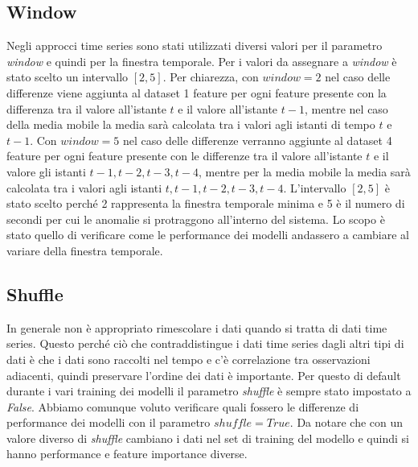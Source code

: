 \subsection{Window}
Negli approcci time series sono stati utilizzati diversi valori per il parametro \textit{window} e quindi per la finestra temporale. Per i valori da assegnare a \textit{window} \`e stato scelto un intervallo $[2,5]$. Per chiarezza, con $window=2$ nel caso delle differenze viene aggiunta al dataset 1 feature per ogni feature presente con la differenza tra il valore all'istante $t$ e il valore all'istante $t-1$, mentre nel caso della media mobile la media sar\`a calcolata tra i valori agli istanti di tempo $t$ e $t-1$. Con $window=5$ nel caso delle differenze verranno aggiunte al dataset 4 feature per ogni feature presente con le differenze tra il valore all'istante $t$ e il valore gli istanti $t-1,t-2,t-3,t-4$, mentre per la media mobile la media sar\`a calcolata tra i valori agli istanti $t,t-1,t-2,t-3,t-4$.
L'intervallo $[2,5]$ \`e stato scelto perch\'e 2 rappresenta la finestra temporale minima e 5 \`e il numero di secondi per cui le anomalie si protraggono all'interno del sistema.
Lo scopo \`e stato quello di verificare come le performance dei modelli andassero a cambiare al variare della finestra temporale.

\subsection{Shuffle}
In generale non \`e appropriato rimescolare i dati quando si tratta di dati time series. Questo perch\'e ci\`o che contraddistingue i dati time series dagli altri tipi di dati \`e che i dati sono raccolti nel tempo e c'\`e correlazione tra osservazioni adiacenti, quindi preservare l'ordine dei dati \`e importante. Per questo di default durante i vari training dei modelli il parametro \textit{shuffle} \`e sempre stato impostato a \textit{False}. Abbiamo comunque voluto verificare quali fossero le differenze di performance dei modelli con il parametro $shuffle=True$. Da notare che con un valore diverso di \textit{shuffle} cambiano i dati nel set di training del modello e quindi si hanno performance e feature importance diverse.

 \vspace{-0.5cm}
 \vspace{-0.3cm}
